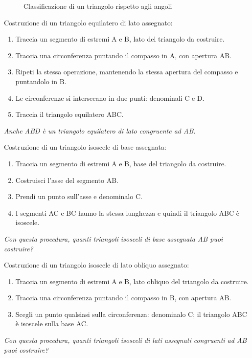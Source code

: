 \begin{inaccessibleblock}
 \begin{figure}[htb]
\centering
\caption{Classificazione di un triangolo rispetto agli 
angoli}\label{fig:class_triangolo_angoli}
\end{figure}
\end{inaccessibleblock}

\begin{procedura}
	Costruzione di un triangolo equilatero di lato assegnato:
	\begin{enumerate} [nosep]
		\item 
		Traccia un segmento di estremi A e B, lato del triangolo da costruire.
		\item 
		Traccia una circonferenza puntando il compasso in A, con apertura AB.  
		\item 
		Ripeti la stessa operazione, mantenendo la stessa apertura del compasso e puntandolo in B.  
		\item 
		Le circonferenze si intersecano in due punti: denominali C e D.  	
		\item 
		Traccia il triangolo equilatero ABC.	
		\end{enumerate}
		\textit{Anche ABD è un triangolo equilatero di lato congruente ad AB.}
\end{procedura}


    
\begin{procedura}
	Costruzione di un triangolo isoscele di base assegnata:
	\begin{enumerate} [nosep]
		\item 
		Traccia un segmento di estremi A e B, base del triangolo da costruire.
		\item 
		Costruisci l'asse del segmento AB.
		\item 
		Prendi un punto sull'asse e denominalo C.
		\item 
		I segmenti AC e BC hanno la stessa lunghezza e quindi il triangolo ABC è isoscele.
	\end{enumerate}
\textit{ Con questa procedura, quanti triangoli isosceli di base assegnata AB puoi costruire?}	
\end{procedura}
 
 \begin{procedura}
 	Costruzione di un triangolo isoscele di lato obliquo assegnato:
 	\begin{enumerate} [nosep]
 		\item 
 		Traccia un segmento di estremi A e B, lato obliquo del triangolo da costruire.  
 		\item 
 		Traccia una circonferenza puntando il compasso in B, con apertura AB.  
 		\item 
 		Scegli un punto qualsiasi sulla circonferenza: denominalo C; il triangolo ABC è isoscele sulla base AC.  
 	\end{enumerate}
 	\textit{ Con questa procedura, quanti triangoli isosceli di lati assegnati congruenti ad AB puoi costruire?}	
 \end{procedura}
 

